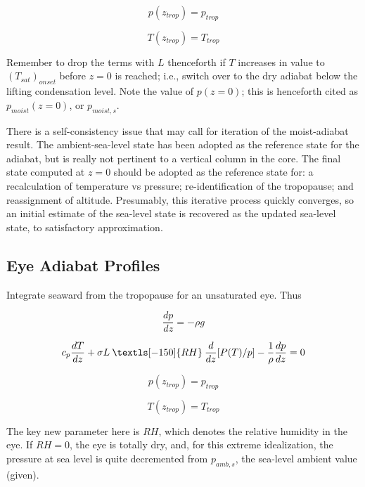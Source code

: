 \documentclass[preprint, prX]{revtex4}
\newcommand{\dd}[2]{\frac{d#1}{d#2}}
\newcommand{\rh}{\:\textls[-150]{RH}\:}
\newcommand{\ztrop}{z_{trop}}
\begin{document}
\begin{equation}
	p(\ztrop) = p_{trop} 
\end{equation}

\begin{equation}
	T(\ztrop ) = T_{trop}
\end{equation}

Remember to drop the terms with $L$ thenceforth if $T$ increases in value to $(T_{sat})_{onset}$ before $z=0$ is reached; i.e., switch over to the dry adiabat below the lifting condensation level. Note the value of $p(z=0)$; this is henceforth cited as $p_{moist}(z=0)$, or $p_{moist,s}$.

There is a self-consistency issue that may call for iteration of the moist-adiabat result. The ambient-sea-level state has been adopted as the reference state for the adiabat, but is really not pertinent to a vertical column in the core. The final state computed at $z=0$ should be adopted as the reference state for: a recalculation of temperature vs pressure; re-identification of the tropopause; and reassignment of altitude. Presumably, this iterative process quickly converges, so an initial estimate of the sea-level state is recovered as the updated sea-level state, to satisfactory approximation.

\subsection{Eye Adiabat Profiles}

Integrate seaward from the tropopause for an unsaturated eye. Thus

\begin{equation}
	\dd{p}{z} = - \rho g
\end{equation}

\begin{equation}
	c_p \dd{T}{z} + \sigma L \rh \dd{}{z} [ P(T) / p] - \frac{1}{\rho} \dd{p}{z} = 0
\end{equation}

\begin{equation}
	p(\ztrop) = p_{trop} 
\end{equation}

\begin{equation}
	T(\ztrop ) = T_{trop}
\end{equation}

The key new parameter here is $RH$, which denotes the relative humidity in the eye. If $RH=0$, the eye is totally dry, and, for this extreme idealization, the pressure at sea level is quite decremented from $p_{amb,s}$, the sea-level ambient value (given).
\end{document}
